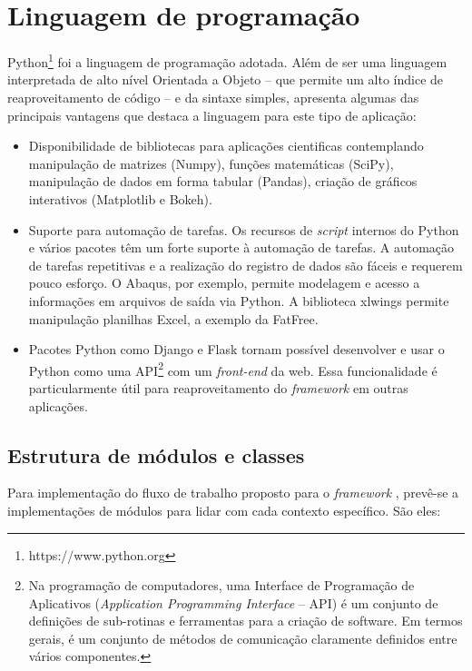 \section{Linguagem de programação}

Python\footnote{https://www.python.org} foi a linguagem de programação adotada. Além de ser uma linguagem interpretada de alto nível Orientada a Objeto -- que permite um alto índice de reaproveitamento de código -- e da sintaxe simples,  apresenta algumas das principais vantagens que destaca a linguagem para este tipo de aplicação:

\begin{itemize}
    \item Disponibilidade de bibliotecas para aplicações cientificas contemplando manipulação de matrizes (Numpy), funções matemáticas (SciPy), manipulação de dados em forma tabular (Pandas), criação de gráficos interativos (Matplotlib e Bokeh).

    \item Suporte para automação de tarefas. Os recursos de \textit{script} internos do Python e vários pacotes têm um forte suporte à automação de tarefas. A automação de tarefas repetitivas e a realização do registro de dados são fáceis e requerem pouco esforço. O Abaqus, por exemplo, permite modelagem e acesso a informações em arquivos de saída via Python. A biblioteca xlwings permite manipulação planilhas Excel, a exemplo da FatFree.

    \item Pacotes Python como Django e Flask tornam possível desenvolver e usar o Python como uma API\footnote{Na programação de computadores, uma Interface de Programação de Aplicativos (\textit{Application Programming Interface} -- API) é um conjunto de definições de sub-rotinas e ferramentas para a criação de software. Em termos gerais, é um conjunto de métodos de comunicação claramente definidos entre vários componentes.} com um \textit{front-end} da web. Essa funcionalidade é particularmente útil para reaproveitamento do \textit{framework}  em outras aplicações.
\end{itemize}

\subsection{Estrutura de módulos e classes}

Para implementação do fluxo de trabalho proposto para o \textit{framework} , prevê-se a implementações de módulos para lidar com cada contexto específico. São eles:


